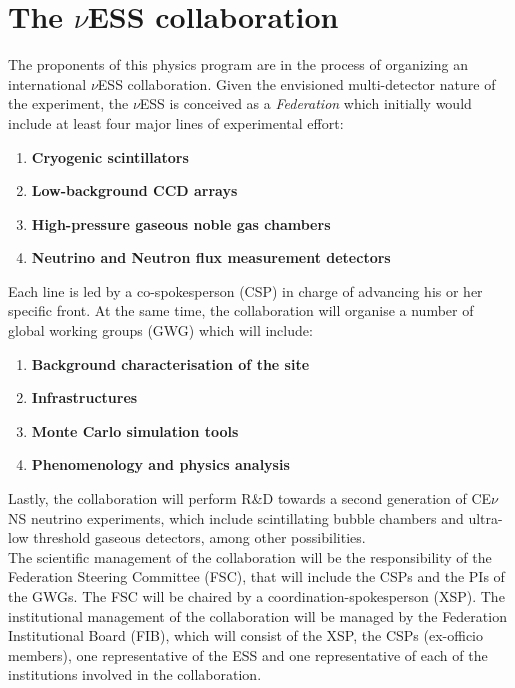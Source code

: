 \documentclass[12pt]{article}
\begin{document}
\section{The $\nu$ESS collaboration}
The proponents of this physics program are in the process of organizing an international $\nu$ESS collaboration. Given the envisioned multi-detector nature of the experiment, the $\nu$ESS is conceived as a {\em Federation} which initially would include at least four major lines of experimental effort:
\begin{enumerate}
    \item {\bf Cryogenic scintillators}
     \item {\bf Low-background CCD arrays}
      \item {\bf High-pressure gaseous noble gas chambers}
     \item {\bf Neutrino and Neutron flux measurement detectors}
\end{enumerate}

Each line is led by a co-spokesperson (CSP) in charge of advancing his or her specific front. At the same time, the collaboration will organise a number of global working groups (GWG) which will include:

\begin{enumerate}
    \item {\bf Background characterisation of the site}
     \item {\bf Infrastructures}
      \item {\bf Monte Carlo simulation tools}
     \item {\bf Phenomenology and physics analysis}
\end{enumerate}

Lastly, the collaboration will perform R\&D towards a second generation of CE$\nu$NS neutrino experiments, which include scintillating  bubble  chambers and ultra-low threshold gaseous detectors, among other possibilities. \\

The scientific management of the collaboration will be the responsibility of the Federation Steering Committee (FSC), that will include the CSPs and the PIs of the GWGs. The FSC will be chaired by a coordination-spokesperson (XSP). The institutional management of the collaboration will be managed by the Federation Institutional Board (FIB), which will consist of the XSP, the CSPs (ex-officio members), one representative of the ESS and one representative of each of the institutions involved in the collaboration.\\
\end{document}
